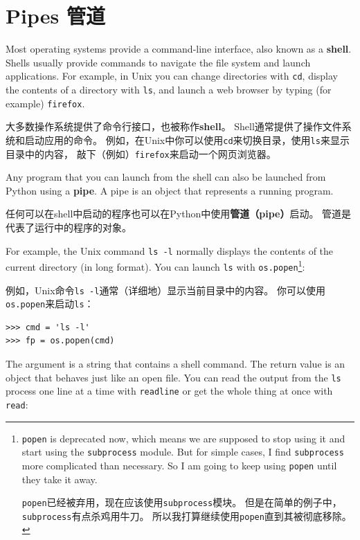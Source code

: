 \documentclass[10pt]{book}
\begin{document}
\begin{CJK}{UTF8}{gbsn}
\begin{exercise}
\end{exercise}


\section{Pipes 管道}

Most operating systems provide a command-line interface,
also known as a {\bf shell}.  Shells usually provide commands
to navigate the file system and launch applications.  For
example, in Unix you can change directories with {\tt cd},
display the contents of a directory with {\tt ls}, and launch
a web browser by typing (for example) {\tt firefox}.

大多数操作系统提供了命令行接口，也被称作{\bf shell}。
Shell通常提供了操作文件系统和启动应用的命令。
例如，在Unix中你可以使用{\tt cd}来切换目录，使用{\tt ls}来显示目录中的内容，
敲下（例如）{\tt firefox}来启动一个网页浏览器。

Any program that you can launch from the shell can also be
launched from Python using a {\bf pipe}.  A pipe is an object
that represents a running program.

任何可以在shell中启动的程序也可以在Python中使用{\bf 管道（pipe）}启动。
管道是代表了运行中的程序的对象。

For example, the Unix command {\tt ls -l} normally displays the
contents of the current directory (in long format).  You can
launch {\tt ls} with {\tt os.popen}\footnote{{\tt popen} is deprecated
now, which means we are supposed to stop using it and start using
the {\tt subprocess} module.  But for simple cases, I find
{\tt subprocess} more complicated than necessary.  So I am going
to keep using {\tt popen} until they take it away.

{\tt popen}已经被弃用，现在应该使用{\tt subprocess}模块。
但是在简单的例子中，{\tt subprocess}有点杀鸡用牛刀。
所以我打算继续使用{\tt popen}直到其被彻底移除。

}:

例如，Unix命令{\tt ls -l}通常（详细地）显示当前目录中的内容。
你可以使用{\tt os.popen}来启动{\tt ls}：

\begin{verbatim}
>>> cmd = 'ls -l'
>>> fp = os.popen(cmd)
\end{verbatim}
%
The argument is a string that contains a shell command.  The
return value is an object that behaves just like an open
file.  You can read the output from the {\tt ls} process one
line at a time with {\tt readline} or get the whole thing at
once with {\tt read}:


\end{CJK}
\end{document}
